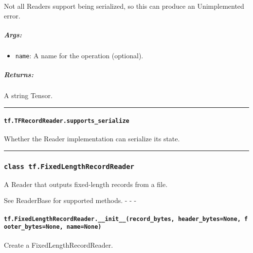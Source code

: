 Not all Readers support being serialized, so this can produce an
Unimplemented error.

\subparagraph{Args: }\label{args-35}

\begin{itemize}
\tightlist
\item
  \texttt{name}: A name for the operation (optional).
\end{itemize}

\subparagraph{Returns: }\label{returns-30}

A string Tensor.

\begin{center}\rule{0.5\linewidth}{\linethickness}\end{center}

\paragraph{\texorpdfstring{\texttt{tf.TFRecordReader.supports\_serialize}
}{tf.TFRecordReader.supports\_serialize }}\label{tf.tfrecordreader.supportsux5fserialize}

Whether the Reader implementation can serialize its state.

\begin{center}\rule{0.5\linewidth}{\linethickness}\end{center}

\subsubsection{\texorpdfstring{\texttt{class\ tf.FixedLengthRecordReader}
}{class tf.FixedLengthRecordReader }}\label{class-tf.fixedlengthrecordreader}

A Reader that outputs fixed-length records from a file.

See ReaderBase for supported methods. - - -

\paragraph{\texorpdfstring{\texttt{tf.FixedLengthRecordReader.\_\_init\_\_(record\_bytes,\ header\_bytes=None,\ footer\_bytes=None,\ name=None)}
}{tf.FixedLengthRecordReader.\_\_init\_\_(record\_bytes, header\_bytes=None, footer\_bytes=None, name=None) }}\label{tf.fixedlengthrecordreader.ux5fux5finitux5fux5frecordux5fbytes-headerux5fbytesnone-footerux5fbytesnone-namenone}

Create a FixedLengthRecordReader.

